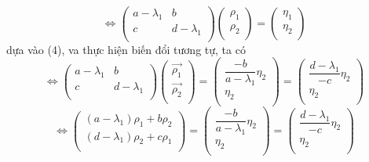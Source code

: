 \documentclass[a4paper]{article}
\begin{document}
    \begin{equation*}
        \Leftrightarrow
        \begin{pmatrix}
            a-\lambda_1 & b         \\
            c         & d-\lambda_1 \\
        \end{pmatrix}
        \begin{pmatrix}
            \rho_1 \\
            \rho_2 \\
        \end{pmatrix}
        =
        \begin{pmatrix}
            \eta_1 \\
            \eta_2 \\
        \end{pmatrix}
    \end{equation*}
    dựa vào (4), va thực hiện biến đổi tương tự, ta có
    \begin{equation*}
        \Leftrightarrow
        \begin{pmatrix}
            a-\lambda_1 & b         \\
            c         & d-\lambda_1 \\
        \end{pmatrix}
        \begin{pmatrix}
            \vec{\rho_1} \\
            \vec{\rho_2} \\
        \end{pmatrix}
        =
        \begin{pmatrix}
            \dfrac{-b}{a-\lambda_1}\eta_2 \\
            \eta_2 \\
        \end{pmatrix}
        =
        \begin{pmatrix}
            \dfrac{d - \lambda_1}{-c}\eta_2 \\
            \eta_2 \\
        \end{pmatrix}
    \end{equation*}
    \begin{equation*}
        \Leftrightarrow
        \begin{pmatrix}
        (a-\lambda_1) \rho_1 + b \rho_2         \\
        (d-\lambda_1) \rho_2 + c \rho_1 \\
        \end{pmatrix}
        =
        \begin{pmatrix}
            \dfrac{-b}{a-\lambda_1}\eta_2 \\
            \eta_2 \\
        \end{pmatrix}
        =
        \begin{pmatrix}
            \dfrac{d - \lambda_1}{-c}\eta_2 \\
            \eta_2 \\
        \end{pmatrix}
    \end{equation*}
\end{document}
